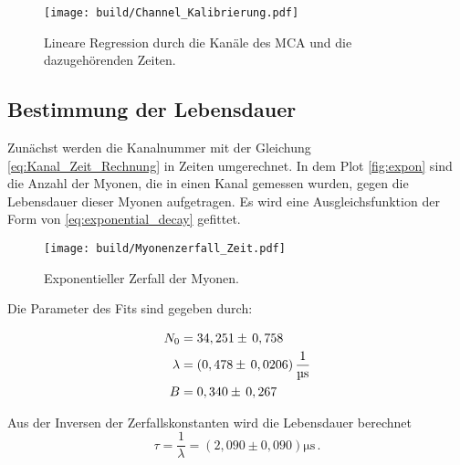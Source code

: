 \begin{figure}[H]
    \centering
    \texttt{[image: build/Channel\_Kalibrierung.pdf]}
    \caption{Lineare Regression durch die Kanäle des MCA und die dazugehörenden Zeiten.}
    \label{fig:lin_reg_Channel_zeit}
\end{figure}

\subsection{Bestimmung der Lebensdauer}
\label{sec:Bes_Leb}

Zunächst werden die Kanalnummer mit der Gleichung \autoref{eq:Kanal_Zeit_Rechnung} in Zeiten umgerechnet.
In dem Plot \autoref{fig:expon} sind die Anzahl der Myonen, die in einen Kanal gemessen wurden, gegen die Lebensdauer dieser Myonen aufgetragen.
Es wird eine Ausgleichsfunktion der Form von \autoref{eq:exponential_decay} gefittet.

\begin{figure}[H]
    \centering
    \texttt{[image: build/Myonenzerfall\_Zeit.pdf]}
    \caption{Exponentieller Zerfall der Myonen.}
    \label{fig:expon}
\end{figure}

Die Parameter des Fits sind gegeben durch:

\begin{align*}
    N_0         &=34,251  \pm \, 0,758                                 \\
    \lambda     &= (0,478 \pm \, 0,0206)  \, \unit{\dfrac{1}{\micro\second}} \\
    B           &=0,340   \pm \, 0,267
\end{align*}

Aus der Inversen der Zerfallskonstanten wird die Lebensdauer berechnet
\begin{equation*}
    \tau = \dfrac{1}{\lambda} = \left(2,090  \pm 0,090 \right) \unit{\micro\second} \,.
\end{equation*}
